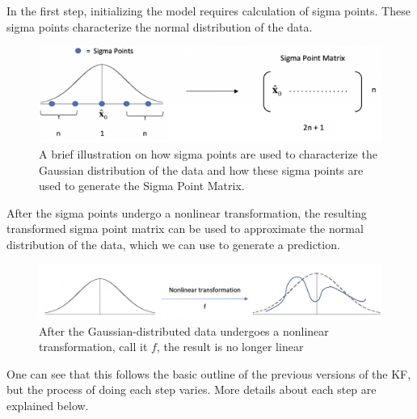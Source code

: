 \noindent In the first step, initializing the model requires calculation of sigma points. These sigma points characterize the normal distribution of the data. 
\begin{figure}[h]
    \centering
    \includegraphics[scale = 0.4]{SPM.png}
    \caption{A brief illustration on how sigma points are used to characterize the Gaussian distribution of the data and how these sigma points are used to generate the Sigma Point Matrix.}
\end{figure}

\noindent After the sigma points undergo a nonlinear transformation, the resulting transformed sigma point matrix can be used to approximate the normal distribution of the data, which we can use to generate a prediction.
\begin{figure}[h]
    \centering
    \includegraphics[scale = 0.45]{transform.png}
    \caption{After the Gaussian-distributed data undergoes a nonlinear transformation, call it $f$, the result is no longer linear}
\end{figure}

\newpage
\noindent One can see that this follows the basic outline of the previous versions of the KF, but the process of doing each step varies. More details about each step are explained below.

